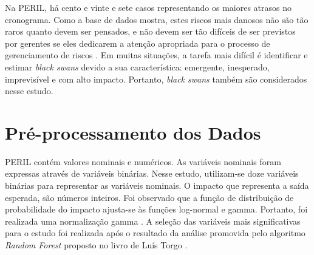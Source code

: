 Na PERIL, há cento e vinte e sete casos representando os maiores atrasos no cronograma. Como a base de dados mostra, estes riscos mais danosos não são tão raros quanto devem ser pensados, e não devem ser tão difíceis de ser previstos por gerentes se eles dedicarem a atenção apropriada para o processo de gerenciamento de riscos \cite{KEND2003BOOK}. Em muitas situações, a tarefa mais difícil é identificar e estimar \textit{black swans} devido a sua característica: emergente, inesperado, imprevisível e com alto impacto. Portanto, \textit{black swans} também são considerados nesse estudo.

\section{Pré-processamento dos Dados}
\label{sec:datapreprocessing}

PERIL contém valores nominais e numéricos. As variáveis nominais foram expressas através de variáveis binárias. Nesse estudo, utilizam-se doze variáveis binárias para representar as variáveis nominais. O impacto que representa a saída esperada, são números inteiros. Foi observado que a função de distribuição de probabilidade do impacto ajusta-se às funções log-normal e gamma. Portanto, foi realizada uma normalização gamma \cite{han2006data}. A seleção das variáveis mais significativas para o estudo foi realizada após o resultado da análise promovida pelo algoritmo \textit{Random Forest} proposto no livro de Luís Torgo \cite{torgo2003data}.

